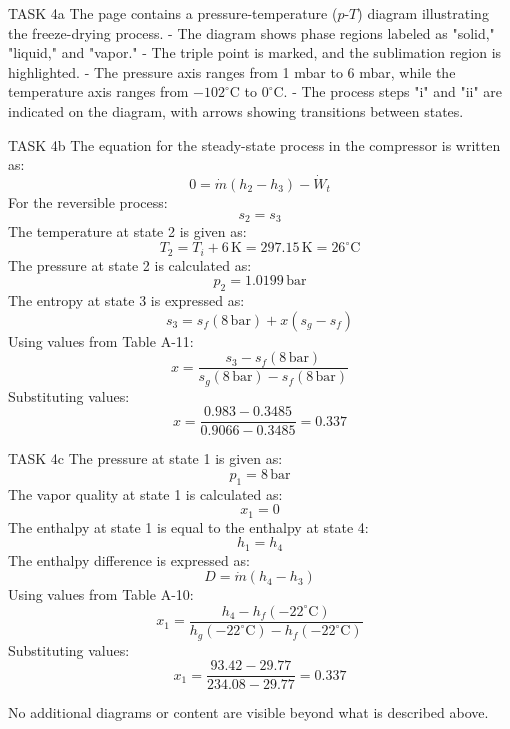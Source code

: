 TASK 4a  
The page contains a pressure-temperature (\(p\)-\(T\)) diagram illustrating the freeze-drying process.  
- The diagram shows phase regions labeled as "solid," "liquid," and "vapor."  
- The triple point is marked, and the sublimation region is highlighted.  
- The pressure axis ranges from 1 mbar to 6 mbar, while the temperature axis ranges from \(-102^\circ\text{C}\) to \(0^\circ\text{C}\).  
- The process steps "i" and "ii" are indicated on the diagram, with arrows showing transitions between states.  

TASK 4b  
The equation for the steady-state process in the compressor is written as:  
\[
0 = \dot{m}(h_2 - h_3) - \dot{W}_t
\]  
For the reversible process:  
\[
s_2 = s_3
\]  
The temperature at state 2 is given as:  
\[
T_2 = T_i + 6 \, \text{K} = 297.15 \, \text{K} = 26^\circ\text{C}
\]  
The pressure at state 2 is calculated as:  
\[
p_2 = 1.0199 \, \text{bar}
\]  
The entropy at state 3 is expressed as:  
\[
s_3 = s_f(8 \, \text{bar}) + x(s_g - s_f)
\]  
Using values from Table A-11:  
\[
x = \frac{s_3 - s_f(8 \, \text{bar})}{s_g(8 \, \text{bar}) - s_f(8 \, \text{bar})}
\]  
Substituting values:  
\[
x = \frac{0.983 - 0.3485}{0.9066 - 0.3485} = 0.337
\]  

TASK 4c  
The pressure at state 1 is given as:  
\[
p_1 = 8 \, \text{bar}
\]  
The vapor quality at state 1 is calculated as:  
\[
x_1 = 0
\]  
The enthalpy at state 1 is equal to the enthalpy at state 4:  
\[
h_1 = h_4
\]  
The enthalpy difference is expressed as:  
\[
D = \dot{m}(h_4 - h_3)
\]  
Using values from Table A-10:  
\[
x_1 = \frac{h_4 - h_f(-22^\circ\text{C})}{h_g(-22^\circ\text{C}) - h_f(-22^\circ\text{C})}
\]  
Substituting values:  
\[
x_1 = \frac{93.42 - 29.77}{234.08 - 29.77} = 0.337
\]  

No additional diagrams or content are visible beyond what is described above.